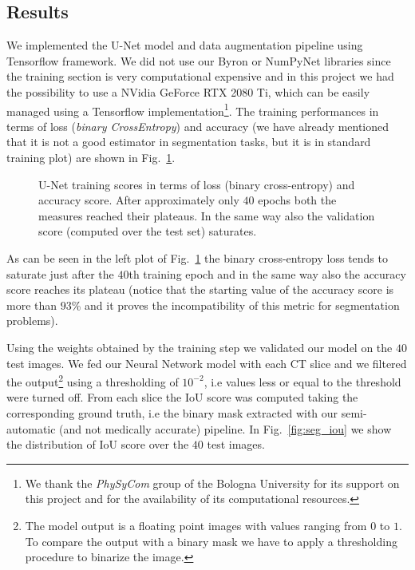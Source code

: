 \documentclass{standalone}
\begin{document}
\subsection[Results]{Results}\label{segmentation:results}

We implemented the U-Net model and data augmentation pipeline using \textsf{Tensorflow} framework.
We did not use our \textsf{Byron} or \textsf{NumPyNet} libraries since the training section is very computational expensive and in this project we had the possibility to use a NVidia GeForce RTX 2080 Ti, which can be easily managed using a \textsf{Tensorflow} implementation\footnote{
  We thank the \emph{PhySyCom} group of the Bologna University for its support on this project and for the availability of its computational resources.
}.
The training performances in terms of loss (\emph{binary CrossEntropy}) and accuracy (we have already mentioned that it is not a good estimator in segmentation tasks, but it is  in standard training plot) are shown in Fig.~\ref{fig:seg_train}.

\begin{figure}[htbp]
\centering
\def\svgwidth{0.85\textwidth}

\caption{U-Net training scores in terms of loss (binary cross-entropy) and accuracy score.
After approximately only $40$ epochs both the measures reached their plateaus.
In the same way also the validation score (computed over the test set) saturates.
}
\label{fig:seg_train}
\end{figure}

As can be seen in the left plot of Fig.~\ref{fig:seg_train} the binary cross-entropy loss tends to saturate just after the $40$th training epoch and in the same way also the accuracy score reaches its plateau (notice that the starting value of the accuracy score is more than $93$\% and it proves the incompatibility of this metric for segmentation problems).

Using the weights obtained by the training step we validated our model on the $40$ test images.
We fed our Neural Network model with each CT slice and we filtered the output\footnote{
  The model output is a floating point images with values ranging from $0$ to $1$.
  To compare the output with a binary mask we have to apply a thresholding procedure to binarize the image.
} using a thresholding of $10^{-2}$, i.e values less or equal to the threshold were turned off.
From each slice the IoU score was computed taking the corresponding ground truth, i.e the binary mask extracted with our semi-automatic (and not medically accurate) pipeline.
In Fig.~\ref{fig:seg_iou} we show the distribution of IoU score over the $40$ test images.
\end{document}
